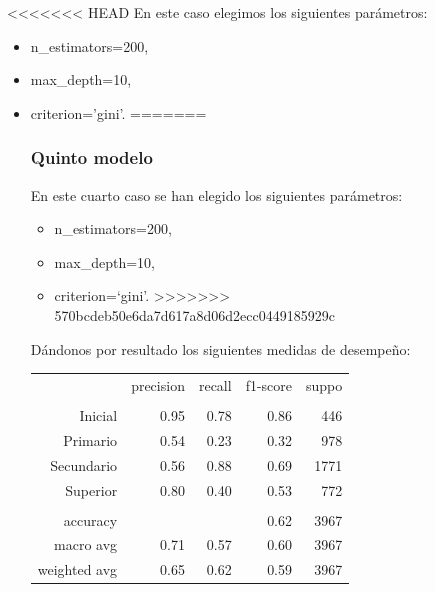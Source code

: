 \documentclass[a4paper]{article}
\begin{document}
<<<<<<< HEAD
            En este caso elegimos los siguientes parámetros:
            \begin{itemize}
                \item n\_estimators=200,
                \item max\_depth=10,
                \item criterion='gini'.
=======
        \subsubsection{Quinto modelo}

            En este cuarto caso se han elegido los siguientes parámetros:
            \begin{itemize}
                \item n\_estimators=200,
                \item max\_depth=10,
                \item criterion=`gini'.
>>>>>>> 570bcdeb50e6da7d617a8d06d2ecc0449185929c
            \end{itemize}

            Dándonos por resultado los siguientes medidas de desempeño:
            \begin{table}[H]
                \centering
                \begin{tabular}{rrrrr}
                    ~ & precision & recall & f1-score & suppo \\
                    & & & & \\
                    Inicial    & 0.95 & 0.78 & 0.86 & 446 \\
                    Primario   & 0.54 & 0.23 & 0.32 & 978 \\
                    Secundario & 0.56 & 0.88 & 0.69 & 1771 \\
                    Superior   & 0.80 & 0.40 & 0.53 & 772 \\
                    & & & & \\
                    accuracy & & & 0.62 & 3967 \\
                    macro avg & 0.71 & 0.57 & 0.60 & 3967 \\
                    weighted avg & 0.65 & 0.62 & 0.59 & 3967 \\
                \end{tabular}
            \end{table}


\end{itemize}
\end{document}
